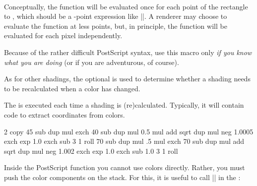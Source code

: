 \begin{command}{\pgfdeclarefunctionalshading{}\\
}
    Conceptually, the function will be evaluated once for each point of the
    rectangle  to , which
    should be a \pgfname-point expression like |\pgfpoint{100bp}{100bp}|. A
    renderer may choose to evaluate the function at less points, but, in
    principle, the function will be evaluated for each pixel independently.

    Because of the rather difficult PostScript syntax, use this macro only
    \emph{if you know what you are doing} (or if you are adventurous, of
    course).

    As for other shadings, the optional  is used to determine
    whether a shading needs to be recalculated when a color has changed.

    The  is executed each time a shading is (re)calculated.
    Typically, it will contain code to extract coordinates from colors.
\begin{codeexample}[]
    {\pgfpointorigin}{\pgfpoint{4cm}{4cm}}{}{
  2 copy
  45 sub dup mul exch
  40 sub dup mul 0.5 mul add sqrt
  dup mul neg 1.0005 exch exp 1.0 exch sub
  3 1 roll
  70 sub dup mul .5 mul exch
  70 sub dup mul add sqrt
  dup mul neg 1.002 exch exp 1.0 exch sub
  1.0 3 1 roll
}
\end{codeexample}

    Inside the PostScript function  you cannot use colors
    directly. Rather, you must push the color components on the stack. For
    this, it is useful to call |\pgfshadecolortorgb| in the :


\end{command}
